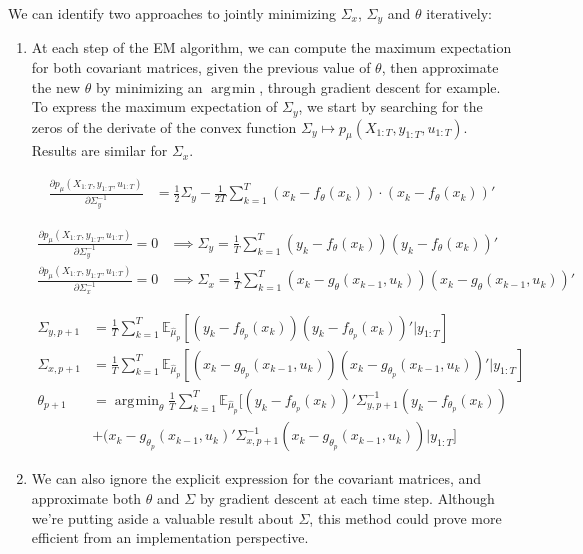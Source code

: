 \documentclass[10pt,a4paper]{report}
\DeclareMathOperator*{\argmin}{\arg\!\min}
\begin{document}
We can identify two approaches to jointly minimizing $\Sigma_x$, $\Sigma_y$ and $\theta$ iteratively:
\begin{enumerate}
    \item At each step of the EM algorithm, we can compute the maximum expectation for both covariant matrices, given the previous value of $\theta$, then approximate the new $\theta$ by minimizing an $\argmin$, through gradient descent for example.
          To express the maximum expectation of $\Sigma_y$, we start by searching for the zeros of the derivate of the convex function $\Sigma_y \mapsto p_{\mu}(X_{1:T}, y_{1:T}, u_{1:T})$.
          Results are similar for $\Sigma_x$.

          \begin{align*}
              \frac{\partial p_{\mu}(X_{1:T}, y_{1:T}, u_{1:T})}{\partial \Sigma_y^{-1}} & = \frac{1}{2} \Sigma_y - \frac{1}{2T} \sum_{k=1}^T (x_k - f_{\theta}(x_{k})) \cdot (x_k - f_{\theta}(x_{k}))'
          \end{align*}

          \begin{align*}
              \frac{\partial p_{\mu}(X_{1:T}, y_{1:T}, u_{1:T})}{\partial \Sigma_y^{-1}} = 0 & \implies \Sigma_y = \frac{1}{T}\sum_{k=1}^T (y_k - f_{\theta}(x_k))(y_k - f_{\theta}(x_k))'                   \\
              \frac{\partial p_{\mu}(X_{1:T}, y_{1:T}, u_{1:T})}{\partial \Sigma_x^{-1}} = 0 & \implies \Sigma_x = \frac{1}{T}\sum_{k=1}^T (x_k - g_{\theta}(x_{k-1}, u_k))(x_k - g_{\theta}(x_{k-1}, u_k))'
          \end{align*}

          \begin{align*}
              \Sigma_{y, p+1} & = \frac{1}{T}\sum_{k=1}^T \mathbb{E}_{\hat \mu_p} \left[ (y_k - f_{\theta_p}(x_k))(y_k - f_{\theta_p}(x_k))' | y_{1:T} \right]                   \\
              \Sigma_{x, p+1} & = \frac{1}{T}\sum_{k=1}^T \mathbb{E}_{\hat \mu_p} \left[ (x_k - g_{\theta_p}(x_{k-1}, u_k))(x_k - g_{\theta_p}(x_{k-1}, u_k))' | y_{1:T} \right] \\
              \theta_{p+1}    & = \argmin_{\theta} \frac{1}{T}\sum_{k=1}^T \mathbb{E}_{\hat \mu_p} [ (y_k - f_{\theta_p}(x_k))' \Sigma_{y, p+1}^{-1} (y_k - f_{\theta_p}(x_k))   \\
                              & + (x_k - g_{\theta_p}(x_{k-1}, u_k)'\Sigma_{x, p+1}^{-1}(x_k - g_{\theta_p}(x_{k-1}, u_k)) | y_{1:T} ]
          \end{align*}
    \item We can also ignore the explicit expression for the covariant matrices, and approximate both $\theta$ and $\Sigma$ by gradient descent at each time step. Although we're putting aside a valuable result about $\Sigma$, this method could prove more efficient from an implementation perspective.
\end{enumerate}
\end{document}
